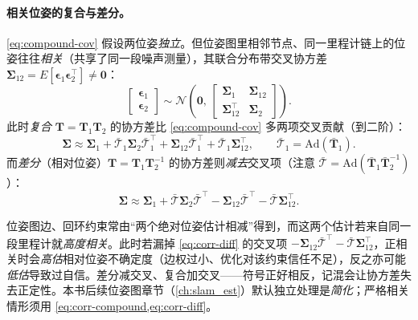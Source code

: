 \paragraph{相关位姿的复合与差分。}\cref{eq:compound-cov} 假设两位姿\emph{独立}。但位姿图里相邻节点、同一里程计链上的位姿往往\emph{相关}（共享了同一段噪声测量），其联合分布带交叉协方差 $\boldsymbol{\Sigma}_{12}=E[\boldsymbol{\epsilon}_1\boldsymbol{\epsilon}_2^\top]\neq\mathbf{0}$：
\begin{equation}
  \begin{bmatrix}\boldsymbol{\epsilon}_1\\\boldsymbol{\epsilon}_2\end{bmatrix}\sim\mathcal{N}\!\left(\mathbf{0},\,\begin{bmatrix}\boldsymbol{\Sigma}_1&\boldsymbol{\Sigma}_{12}\\\boldsymbol{\Sigma}_{12}^\top&\boldsymbol{\Sigma}_2\end{bmatrix}\right).
  \label{eq:joint-corr}
\end{equation}
此时\emph{复合} $\mathbf{T}=\mathbf{T}_1\mathbf{T}_2$ 的协方差比 \cref{eq:compound-cov} 多两项交叉贡献（到二阶）：
\begin{equation}
  \boldsymbol{\Sigma}\approx\boldsymbol{\Sigma}_1+\bar{\boldsymbol{\mathcal{T}}}_1\boldsymbol{\Sigma}_2\bar{\boldsymbol{\mathcal{T}}}_1^\top
  +\boldsymbol{\Sigma}_{12}\bar{\boldsymbol{\mathcal{T}}}_1^\top+\bar{\boldsymbol{\mathcal{T}}}_1\boldsymbol{\Sigma}_{12}^\top,
  \qquad \bar{\boldsymbol{\mathcal{T}}}_1=\mathrm{Ad}(\bar{\mathbf{T}}_1).
  \label{eq:corr-compound}
\end{equation}
而\emph{差分}（相对位姿）$\mathbf{T}=\mathbf{T}_1\mathbf{T}_2^{-1}$ 的协方差则\emph{减去}交叉项（注意 $\bar{\boldsymbol{\mathcal{T}}}=\mathrm{Ad}(\bar{\mathbf{T}}_1\bar{\mathbf{T}}_2^{-1})$）：
\begin{equation}
  \boldsymbol{\Sigma}\approx\boldsymbol{\Sigma}_1+\bar{\boldsymbol{\mathcal{T}}}\boldsymbol{\Sigma}_2\bar{\boldsymbol{\mathcal{T}}}^\top
  -\boldsymbol{\Sigma}_{12}\bar{\boldsymbol{\mathcal{T}}}^\top-\bar{\boldsymbol{\mathcal{T}}}\boldsymbol{\Sigma}_{12}^\top.
  \label{eq:corr-diff}
\end{equation}

\begin{pitfall}
位姿图边、回环约束常由“两个绝对位姿估计相减”得到，而这两个估计若来自同一段里程计就\emph{高度相关}。此时若漏掉 \cref{eq:corr-diff} 的交叉项 $-\boldsymbol{\Sigma}_{12}\bar{\boldsymbol{\mathcal{T}}}^\top-\bar{\boldsymbol{\mathcal{T}}}\boldsymbol{\Sigma}_{12}^\top$，正相关时会\emph{高估}相对位姿不确定度（边权过小、优化对该约束信任不足），反之亦可能\emph{低估}导致过自信。差分减交叉、复合加交叉——符号正好相反，记混会让协方差失去正定性。本书后续位姿图章节（\cref{ch:slam_est}）默认独立处理是\emph{简化}；严格相关情形须用 \cref{eq:corr-compound,eq:corr-diff}。
\end{pitfall}

